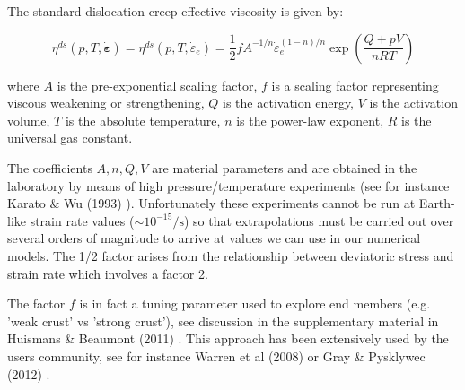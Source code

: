
The standard dislocation creep effective viscosity is given by:
\begin{mdframed}[backgroundcolor=blue!5]
\[
\eta^{ds}(p,T,\dot{\bm \varepsilon})
=\eta^{ds}(p,T,\dot{\varepsilon}_e)
= \frac{1}{2} f A^{-1/n} \dot{\varepsilon}_{e}^{(1-n)/n} \exp \left( \frac{Q+pV}{nRT}  \right)
\] 
\end{mdframed}
where $A$ is the pre-exponential scaling factor, $f$ is a scaling factor
representing viscous weakening or strengthening, $Q$ is the activation energy, 
$V$ is the activation volume, $T$ is the absolute temperature, $n$ is the power-law 
exponent, $R$ is the universal gas constant. 

The coefficients $A,n,Q,V$ are material parameters and are obtained in the laboratory 
by means of high pressure/temperature experiments (see for instance Karato \& Wu (1993) \cite{kawu93}). 
Unfortunately these experiments cannot be run at Earth-like strain rate 
values ($\sim 10^{-15}\si{\per\second}$)
so that extrapolations must be carried out over several orders of magnitude to 
arrive at values we can use in our numerical models. 
The 1/2 factor arises from the relationship between deviatoric stress and strain rate which 
involves a factor 2.

The factor $f$ is in fact a tuning parameter used to explore end members (e.g. 'weak crust' 
vs 'strong crust'), see discussion in the supplementary material in 
Huismans \& Beaumont (2011) \cite{hube11}. 
This approach has been extensively used by the \sopale users community, see 
for instance Warren et al (2008) \cite{wabj08,wabj08b,wabj08c} 
or Gray \& Pysklywec (2012) \cite{grpy12}.


